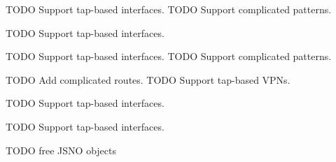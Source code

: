 \begin{DoxyRefList}
T\+O\+DO Support tap-\/based interfaces. T\+O\+DO Support complicated patterns. 
\item[\label{todo__todo000001}%
\Hypertarget{todo__todo000001}%
Member \hyperlink{app-profile_8c_a7ab4018359451259c67e57c83f9b7062}{get\+\_\+openvpn\+\_\+profile\+\_\+name} (char profile\+\_\+name\mbox{[}M\+A\+X\+\_\+\+V\+P\+N\+\_\+\+P\+R\+O\+F\+I\+L\+E\+\_\+\+N\+A\+ME\mbox{]})]T\+O\+DO Support tap-\/based interfaces. 
\item[\label{todo__todo000013}%
\Hypertarget{todo__todo000013}%
Member \hyperlink{route-tree_8c_a7e256826bca6c828a8564f27f84dd517}{get\+\_\+route\+\_\+trees} (enum R\+O\+U\+T\+E\+\_\+\+Q\+U\+E\+RY query\+\_\+id, G\+Node $\ast$node\mbox{[}M\+A\+X\+\_\+\+R\+O\+O\+T\+S\+\_\+\+N\+U\+M\+B\+ER\mbox{]}, int $\ast$roots, int argc, char $\ast$argv\mbox{[}\mbox{]})]T\+O\+DO Support tap-\/based interfaces. T\+O\+DO Support complicated patterns. 
\item[\label{todo__todo000009}%
\Hypertarget{todo__todo000009}%
Member \hyperlink{main_8c_a25501fb2b3310a216de1ece7fa86e233}{get\+\_\+routes} ()]T\+O\+DO Add complicated routes. T\+O\+DO Support tap-\/based V\+P\+Ns. 
\item[\label{todo__todo000020}%
\Hypertarget{todo__todo000020}%
Member \hyperlink{app-profile_8h_a2af00bda795682f62e77417d4969e2e5}{get\+\_\+vpn\+\_\+profile\+\_\+name} (enum V\+P\+N\+\_\+\+M\+E\+T\+H\+O\+DS vpn\+\_\+method, char profile\+\_\+name\mbox{[}M\+A\+X\+\_\+\+V\+P\+N\+\_\+\+N\+A\+ME\mbox{]})]T\+O\+DO Support tap-\/based interfaces. 
\item[\label{todo__todo000002}%
\Hypertarget{todo__todo000002}%
Member \hyperlink{app-profile_8c_aa32bea11cb1c8f99a45bc62cc8f5e455}{get\+\_\+vpn\+\_\+profile\+\_\+name} (enum V\+P\+N\+\_\+\+M\+E\+T\+H\+O\+DS vpn\+\_\+method, char profile\+\_\+name\mbox{[}M\+A\+X\+\_\+\+V\+P\+N\+\_\+\+P\+R\+O\+F\+I\+L\+E\+\_\+\+N\+A\+ME\mbox{]})]T\+O\+DO Support tap-\/based interfaces. 
\item[\label{todo__todo000003}%
\Hypertarget{todo__todo000003}%
Member \hyperlink{gnode-object_8c_af75477fcbe781bc0b17c75c1ad6d1606}{net\+\_\+device\+\_\+free} (Net\+Device $\ast$nd)]T\+O\+DO free J\+S\+NO objects


\end{DoxyRefList}

